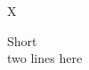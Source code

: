\documentclass{article}
\begin{document}
\begin{figure}X\caption{Short\\ two lines here}\end{figure}
\end{document}
